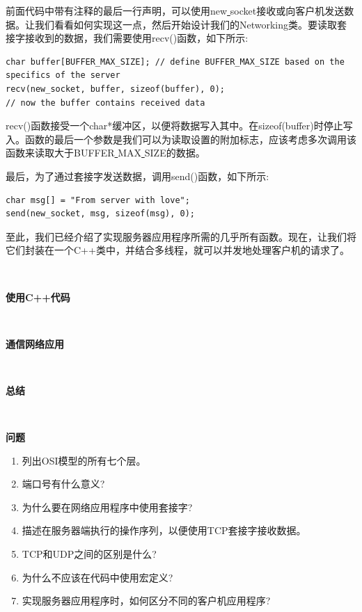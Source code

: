 前面代码中带有注释的最后一行声明，可以使用new\underline{ }socket接收或向客户机发送数据。让我们看看如何实现这一点，然后开始设计我们的Networking类。要读取套接字接收到的数据，我们需要使用recv()函数，如下所示: \par

\begin{lstlisting}[caption={}]
char buffer[BUFFER_MAX_SIZE]; // define BUFFER_MAX_SIZE based on the
specifics of the server
recv(new_socket, buffer, sizeof(buffer), 0);
// now the buffer contains received data
\end{lstlisting}

recv()函数接受一个char*缓冲区，以便将数据写入其中。在sizeof(buffer)时停止写入。函数的最后一个参数是我们可以为读取设置的附加标志，应该考虑多次调用该函数来读取大于BUFFER\underline{ }MAX\underline{ }SIZE的数据。 \par
最后，为了通过套接字发送数据，调用send()函数，如下所示: \par

\begin{lstlisting}[caption={}]
char msg[] = "From server with love";
send(new_socket, msg, sizeof(msg), 0);
\end{lstlisting}

至此，我们已经介绍了实现服务器应用程序所需的几乎所有函数。现在，让我们将它们封装在一个C++类中，并结合多线程，就可以并发地处理客户机的请求了。 \par

\noindent\textbf{}\ \par
\textbf{使用C++代码} \ \par

\noindent\textbf{}\ \par
\textbf{通信网络应用} \ \par

\noindent\textbf{}\ \par
\textbf{总结} \ \par

\noindent\textbf{}\ \par
\textbf{问题} \ \par
\begin{enumerate}
	\item 列出OSI模型的所有七个层。
	\item 端口号有什么意义?
	\item 为什么要在网络应用程序中使用套接字?
	\item 描述在服务器端执行的操作序列，以便使用TCP套接字接收数据。
	\item TCP和UDP之间的区别是什么?
	\item 为什么不应该在代码中使用宏定义?
	\item 实现服务器应用程序时，如何区分不同的客户机应用程序?
\end{enumerate}

